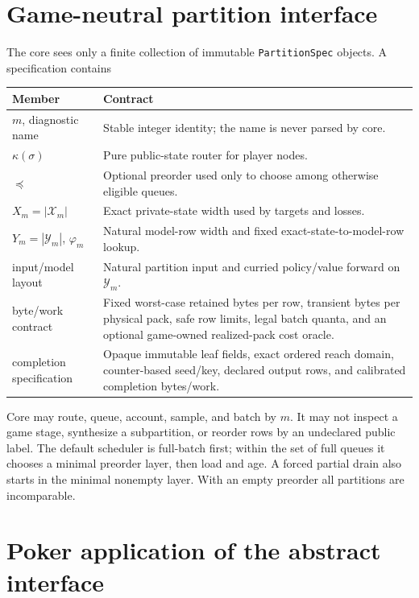 \documentclass[10pt,a4paper]{article}
\newcommand{\Obj}[1]{\texttt{#1}}
\begin{document}
\section{Game-neutral partition interface}

The core sees only a finite collection of immutable \Obj{PartitionSpec}
objects.  A specification contains
\begin{center}
\begin{tabular}{p{}p{}}
\toprule
Member & Contract \\
\midrule
$m$, diagnostic name & Stable integer identity; the name is never parsed by core. \\
$\kappa(\sigma)$ & Pure public-state router for player nodes. \\
$\preceq$ & Optional preorder used only to choose among otherwise eligible queues. \\
$X_m=|\mathcal X_m|$ & Exact private-state width used by targets and losses. \\
$Y_m=|\mathcal Y_m|$, $\varphi_m$ & Natural model-row width and fixed exact-state-to-model-row lookup. \\
input/model layout & Natural partition input and curried policy/value forward on $\mathcal Y_m$. \\
byte/work contract & Fixed worst-case retained bytes per row, transient bytes per physical pack, safe row limits, legal batch quanta, and an optional game-owned realized-pack cost oracle. \\
completion specification & Opaque immutable leaf fields, exact ordered reach domain, counter-based seed/key, declared output rows, and calibrated completion bytes/work. \\
\bottomrule
\end{tabular}
\end{center}
Core may route, queue, account, sample, and batch by $m$.  It may not inspect a
game stage, synthesize a subpartition, or reorder rows by an undeclared public
label.  The default scheduler is full-batch first; within the set of full
queues it chooses a minimal preorder layer, then load and age.  A forced partial
drain also starts in the minimal nonempty layer.  With an empty preorder all
partitions are incomparable.

\section{Poker application of the abstract interface}
\end{document}
